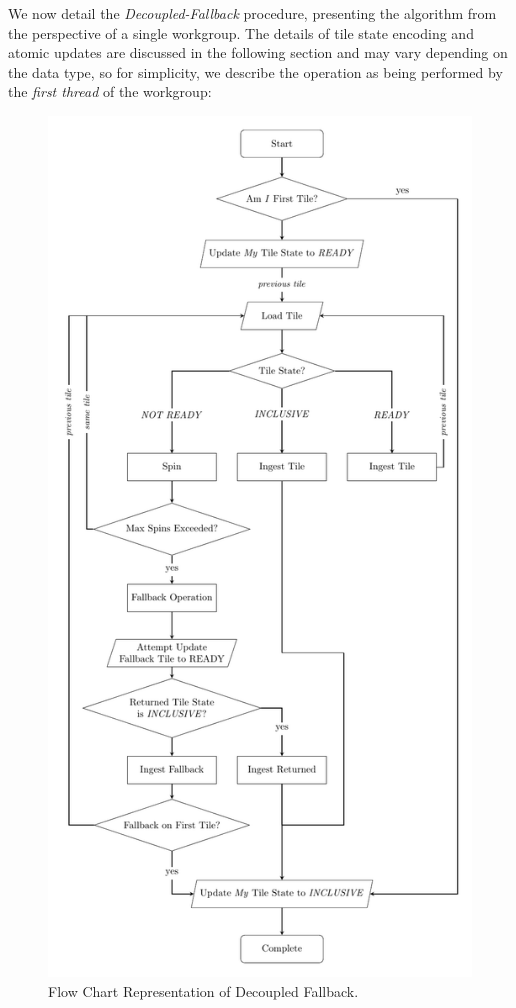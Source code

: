 \documentclass[sigconf]{acmart}
\begin{document}
We now detail the \emph{Decoupled-Fallback} procedure, presenting the algorithm from the perspective of a single workgroup. The details of tile state encoding and atomic updates are discussed in the following section and may vary depending on the data type, so for simplicity, we describe the operation as being performed by the \emph{first thread} of the workgroup:
\begin{figure}
  \centering
  \includegraphics[width=\linewidth]{graphics/FlowChart.pdf}
  \caption{Flow Chart Representation of Decoupled Fallback.\label{fig:decoupled_fallback}}
\end{figure}
\end{document}
